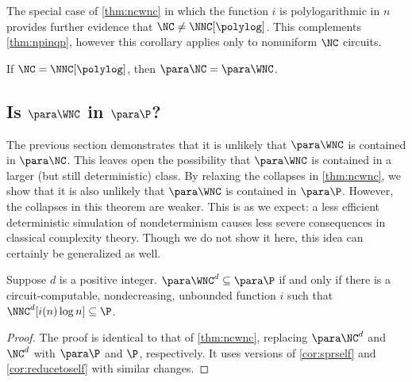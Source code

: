 The special case of \autoref{thm:ncwnc} in which the function $i$ is polylogarithmic in $n$ provides further evidence that $\NC \neq \NNC[\polylog]$.
This complements \autoref{thm:npinqp}, however this corollary applies only to nonuniform $\NC$ circuits.

\begin{corollary}
  If $\NC = \NNC[\polylog]$, then $\para \NC = \para \WNC$.
\end{corollary}

\subsection{Is \texorpdfstring{$\para \WNC$}{paraWNC} in \texorpdfstring{$\para \P$}{paraP}?}
\label{sec:wncp}

%
%
%
The previous section demonstrates that it is unlikely that $\para \WNC$ is contained in $\para \NC$.
%
%
%
This leaves open the possibility that $\para \WNC$ is contained in a larger (but still deterministic) class.
%
%
%
%
%
%
%
%
%
%
%
By relaxing the collapses in \autoref{thm:ncwnc}, we show that it is also unlikely that $\para \WNC$ is contained in $\para \P$.
However, the collapses in this theorem are weaker.
%
%
%
This is as we expect: a less efficient deterministic simulation of nondeterminism causes less severe consequences in classical complexity theory.
%
%
Though we do not show it here, this idea can certainly be generalized as well.

\begin{theorem}\label{thm:wncp}
  Suppose $d$ is a positive integer.
  $\para \WNC^d \subseteq \para \P$ if and only if there is a circuit-computable, nondecreasing, unbounded function $i$ such that $\NNC^d[i(n) \log n] \subseteq \P$.
\end{theorem}
\begin{proof}
  The proof is identical to that of \autoref{thm:ncwnc}, replacing $\para \NC^d$ and $\NC^d$ with $\para \P$ and $\P$, respectively.
  It uses versions of \autoref{cor:sprself} and \autoref{cor:reducetoself} with similar changes.
\end{proof}

